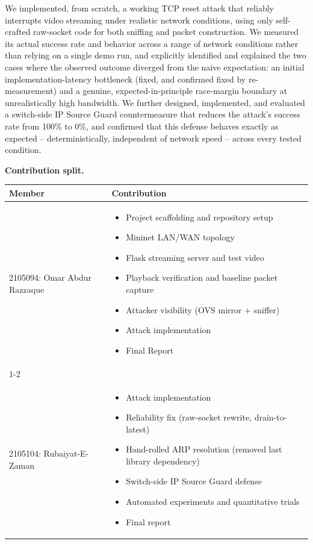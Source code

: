 \documentclass[11pt]{article}
\begin{document}
We implemented, from scratch, a working TCP reset attack that reliably
interrupts video streaming under realistic network conditions, using
only self-crafted raw-socket code for both sniffing and packet
construction. We measured its actual success rate and behavior across a
range of network conditions rather than relying on a single demo run,
and explicitly identified and explained the two cases where the observed
outcome diverged from the naive expectation: an initial
implementation-latency bottleneck (fixed, and confirmed fixed by
re-measurement) and a genuine, expected-in-principle race-margin
boundary at unrealistically high bandwidth. We further designed,
implemented, and evaluated a switch-side IP Source Guard countermeasure
that reduces the attack's success rate from 100\% to 0\%, and confirmed
that this defense behaves exactly as expected -- deterministically,
independent of network speed -- across every tested condition.




\noindent\textbf{Contribution split.}
\begin{center}
\begin{tabular}{@{}p{3.2cm}p{9.5cm}@{}}
\toprule
Member & Contribution \\
\midrule
2105094: Omar Abdur Razzaque &
\begin{minipage}[t]{9.5cm}
\begin{itemize}[leftmargin=*, nosep, topsep=0.3em]
  \item Project scaffolding and repository setup
  \item Mininet LAN/WAN topology
  \item Flask streaming server and test video
  \item Playback verification and baseline packet capture
  \item Attacker visibility (OVS mirror + sniffer)
  \item Attack implementation
  \item Final Report
\end{itemize}
\end{minipage} \\[0.8em]
\cmidrule{1-2}
\\[0.8em]
2105104: Rubaiyat-E-Zaman &
\begin{minipage}[t]{10.5cm}
  \begin{itemize}[leftmargin=*, nosep, topsep=0.3em]
  \item Attack implementation
  \item Reliability fix (raw-socket rewrite, drain-to-latest)
  \item Hand-rolled ARP resolution (removed last library dependency)
  \item Switch-side IP Source Guard defense
  \item Automated experiments and quantitative trials
  \item Final report
\end{itemize}
\end{minipage} \\[0.3em]
\bottomrule
\end{tabular}
\end{center}
\end{document}
